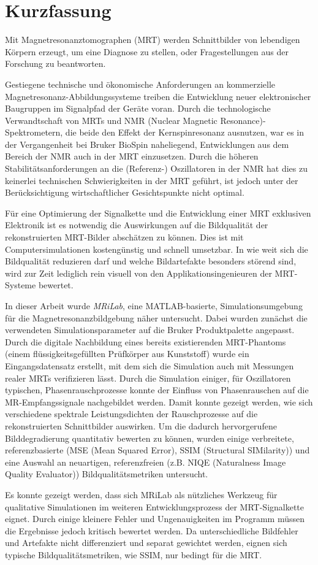 \chapter*{Kurzfassung}
Mit Magnetresonanztomographen (MRT) werden Schnittbilder von lebendigen Körpern erzeugt, um eine Diagnose zu stellen, oder Fragestellungen aus der Forschung zu beantworten.

Gestiegene technische und ökonomische Anforderungen an kommerzielle Magnetresonanz-Abbildungssysteme treiben die Entwicklung neuer elektronischer Baugruppen im Signalpfad der Geräte voran. Durch die technologische Verwandtschaft von MRTs und NMR (Nuclear Magnetic Resonance)-Spektrometern, die beide den Effekt der Kernspinresonanz ausnutzen, war es in der Vergangenheit bei Bruker BioSpin naheliegend, Entwicklungen aus dem Bereich der NMR auch in der MRT einzusetzen. Durch die höheren Stabilitätsanforderungen an die (Referenz-) Oszillatoren in der NMR hat dies zu keinerlei technischen Schwierigkeiten in der MRT geführt, ist jedoch unter der Berücksichtigung wirtschaftlicher Gesichtspunkte nicht optimal.

Für eine Optimierung der Signalkette und die Entwicklung einer MRT exklusiven Elektronik ist es notwendig die Auswirkungen auf die Bildqualität der rekonstruierten MRT-Bilder abschätzen zu können. Dies ist mit Computersimulationen kostengünstig und schnell umsetzbar. In wie weit sich die Bildqualität reduzieren darf und welche Bildartefakte besonders störend sind, wird zur Zeit lediglich rein visuell von den Applikationsingenieuren der MRT-Systeme bewertet.

In dieser Arbeit wurde \textit{MRiLab}, eine MATLAB-basierte, Simulationsumgebung für die Magnetresonanzbildgebung näher untersucht. Dabei wurden zunächst die verwendeten Simulationsparameter auf die Bruker Produktpalette angepasst. Durch die digitale Nachbildung eines bereits existierenden MRT-Phantoms (einem flüssigkeitsgefüllten Prüfkörper aus Kunststoff) wurde ein Eingangsdatensatz erstellt, mit dem sich die Simulation auch mit Messungen realer MRTs verifizieren lässt. Durch die Simulation einiger, für Oszillatoren typischen, Phasenrauschprozesse konnte der Einfluss von Phasenrauschen auf die MR-Empfangssignale nachgebildet werden. Damit konnte gezeigt werden, wie sich verschiedene spektrale Leistungsdichten der Rauschprozesse auf die rekonstruierten Schnittbilder auswirken.
Um die dadurch hervorgerufene Bilddegradierung quantitativ bewerten zu können, wurden einige verbreitete, referenzbasierte (MSE (Mean Squared Error), SSIM (Structural SIMilarity)) und eine Auswahl an neuartigen, referenzfreien (z.B. NIQE (Naturalness Image Quality Evaluator)) Bildqualitätsmetriken untersucht.

Es konnte gezeigt werden, dass sich MRiLab als nützliches Werkzeug für qualitative Simulationen im weiteren Entwicklungsprozess der MRT-Signalkette eignet. Durch einige kleinere Fehler und Ungenauigkeiten im Programm müssen die Ergebnisse jedoch kritisch bewertet werden. Da unterschiedliche Bildfehler und Artefakte nicht differenziert und separat gewichtet werden, eignen sich typische Bildqualitätsmetriken, wie SSIM, nur bedingt für die MRT.



